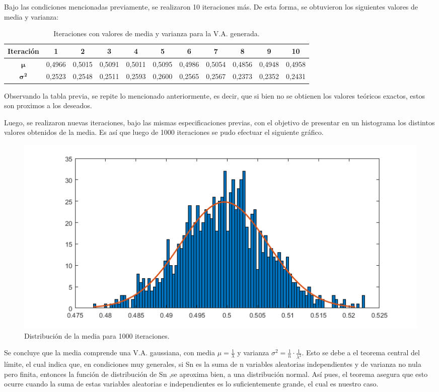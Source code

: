 Bajo las condiciones mencionadas previamente, se realizaron 10 iteraciones más. De esta forma, se obtuvieron los siguientes valores de media y varianza:
\begin{table}[H]
\centering
\begin{tabular}{ccccccccccc}
\hline
\textbf{Iteración}      & \textbf{1} & \textbf{2} & \textbf{3} & \textbf{4} & \textbf{5} & \textbf{6} & \textbf{7} & \textbf{8} & \textbf{9} & \textbf{10} \\ \hline
$\mathbf{\mu}$          & 0,4966     & 0,5015     & 0,5091     & 0,5011     & 0,5095     & 0,4986     & 0,5054     & 0,4856     & 0,4948     & 0,4958      \\
$\mathbf{{\sigma}^{2}}$ & 0,2523     & 0,2548     & 0,2511     & 0,2593     & 0,2600     & 0,2565     & 0,2567     & 0,2373     & 0,2352     & 0,2431     \\ \hline
\end{tabular}
\caption{Iteraciones con valores de media y varianza para la V.A. generada.}
\end{table}

Observando la tabla previa, se repite lo mencionado anteriormente, es decir, que si bien no se obtienen los valores teóricos exactos, estos son proximos a los deseados.

Luego, se realizaron nuevas iteraciones, bajo las mismas especificaciones previas, con el objetivo de presentar en un histograma los distintos valores obtenidos de la media. Es así que luego de 1000 iteraciones se pudo efectuar el siguiente gráfico.
\begin{figure}[H]
	\centering
	\includegraphics[width=0.8\linewidth]{./ImagenesEjercicio1/Media-1.png}
	\caption{Distribución de la media para 1000 iteraciones.}
	\label{fig:media-mc}
\end{figure}

Se concluye que la media comprende una V.A. gaussiana, con media $\mu =\frac{1}{\lambda}$
 y varianza $ \sigma ^2 = \frac{1}{n} \cdot \frac{1}{\lambda ^2}$. Esto se debe a el teorema central del límite, el cual  indica que, en condiciones muy generales, si Sn es la suma de n
 variables aleatorias independientes y de varianza no nula pero finita, entonces la función de distribución de Sn ,se aproxima bien, a una distribución normal.
  Así pues, el teorema asegura que esto ocurre cuando la suma de
   estas variables aleatorias e independientes es lo suficientemente grande, el cual es nuestro caso.

